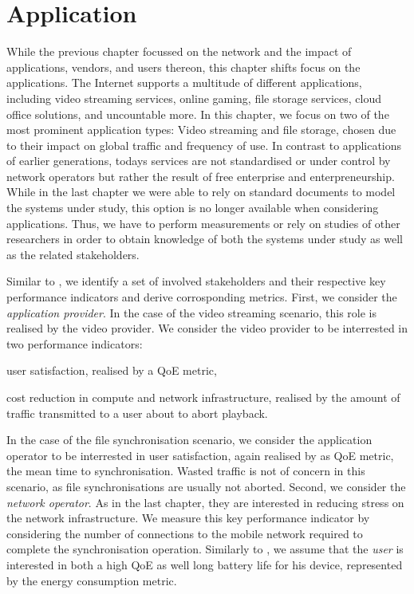 \chapter{Application}\label{chap:application}

\newcommand{\download}{Download\xspace}
\newcommand{\live}{Live\xspace}
\newcommand{\serviceprovisioning}{Provisioning\xspace}
\newcommand{\streaming}{Streaming\xspace}

While the previous chapter focussed on the network and the impact of applications, vendors, and users thereon, this chapter shifts focus on the applications.
The Internet supports a multitude of different applications, including video streaming services, online gaming, file storage services, cloud office solutions, and uncountable more.
In this chapter, we focus on two of the most prominent application types: Video streaming and file storage, chosen due to their impact on global traffic and frequency of use.
In contrast to applications of earlier generations, todays services are not standardised or under control by network operators but rather the result of free enterprise and enterpreneurship.
While in the last chapter we were able to rely on standard documents to model the systems under study, this option is no longer available when considering applications.
Thus, we have to perform measurements or rely on studies of other researchers in order to obtain knowledge of both the systems under study as well as the related stakeholders.

Similar to , we identify a set of involved stakeholders and their respective key performance indicators and derive corrosponding metrics.
First, we consider the \emph{application provider}. 
In the case of the video streaming scenario, this role is realised by the video provider.
We consider the video provider to be interrested in two performance indicators: 
\begin{enumerate*}
\item user satisfaction, realised by a \gls{QoE} metric,
\item cost reduction in compute and network infrastructure, realised by the amount of traffic transmitted to a user about to abort playback.
\end{enumerate*}
In the case of the file synchronisation scenario, we consider the application operator to be interrested in user satisfaction, again realised by as \gls{QoE} metric, the mean time to synchronisation.
Wasted traffic is not of concern in this scenario, as file synchronisations are usually not aborted.
Second, we consider the \emph{network operator}.
As in the last chapter, they are interested in reducing stress on the network infrastructure.
We measure this key performance indicator by considering the number of connections to the mobile network required to complete the synchronisation operation.
Similarly to , we assume that the \emph{user} is interested in both a high \gls{QoE} as well long battery life for his device, represented by the energy consumption metric. 

